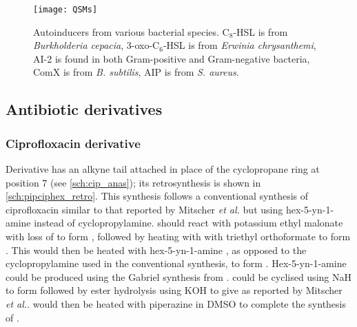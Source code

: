 \begin{figure}[H]
	\begin{center}
		\texttt{[image: QSMs]}
		\caption{Autoinducers from various bacterial species. 
		C$_8$-HSL  is from \textit{Burkholderia cepacia}, 				
		3-oxo-C$_6$-HSL  is from \textit{Erwinia chrysanthemi}, 
		AI-2  is found in both Gram-positive and Gram-negative bacteria, 
		ComX  is from \textit{B. subtilis}, 
		AIP  is from \textit{S. aureus}.		
		\label{fgr:autoinducers}} 
	\end{center}
\end{figure}




\subsection{Antibiotic derivatives}

\subsubsection{Ciprofloxacin derivative }

Derivative  has an alkyne tail attached in place of the cyclopropane ring at position 7 (see \ref{sch:cip_anas}); its retrosynthesis is shown in \ref{sch:pipciphex_retro}. This synthesis follows a conventional synthesis of ciprofloxacin similar to that reported by Mitscher \textit{et al.}\cite{Mitscher1986} but using hex-5-yn-1-amine  instead of cyclopropylamine.  should react with potassium ethyl malonate with loss of  to form , followed by heating with with triethyl orthoformate to form \cite{Mitscher1986, Senthilkumar2009}. This would then be heated with hex-5-yn-1-amine , as opposed to the cyclopropylamine used in the conventional synthesis, to form . Hex-5-yn-1-amine  could be produced using the Gabriel synthesis from \cite{Gabriel1887,Rozkiewicz2006,Pouy2012}.  could be cyclised using NaH to form  followed by ester hydrolysis using KOH to give  as reported by Mitscher \textit{et al.}.  would then be heated with piperazine in DMSO\cite{grohe19877} to complete the synthesis of .

